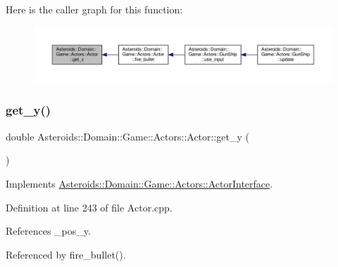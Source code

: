 Here is the caller graph for this function\+:\nopagebreak
\begin{figure}[H]
\begin{center}
\leavevmode
\includegraphics[width=350pt]{classAsteroids_1_1Domain_1_1Game_1_1Actors_1_1Actor_a6b56087b412883601fce5af07d67bd50_icgraph}
\end{center}
\end{figure}
\mbox{\label{classAsteroids_1_1Domain_1_1Game_1_1Actors_1_1Actor_afa54aab6e7be56e04014dd3f80f0e7af}} 
\subsubsection{\texorpdfstring{get\+\_\+y()}{get\_y()}}
{\footnotesize\ttfamily double Asteroids\+::\+Domain\+::\+Game\+::\+Actors\+::\+Actor\+::get\+\_\+y (\begin{DoxyParamCaption}{ }\end{DoxyParamCaption})\hspace{0.3cm}{\ttfamily [virtual]}}



Implements \hyperlink{classAsteroids_1_1Domain_1_1Game_1_1Actors_1_1ActorInterface_a71d55cfa13fd2fcd77eb8f4dfbb77721}{Asteroids\+::\+Domain\+::\+Game\+::\+Actors\+::\+Actor\+Interface}.



Definition at line 243 of file Actor.\+cpp.



References \+\_\+pos\+\_\+y.



Referenced by fire\+\_\+bullet().

